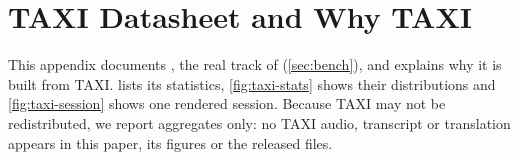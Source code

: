 \section{TAXI Datasheet and Why TAXI}\label{app:taxi}

This appendix documents \taxi, the real track of \bench (\cref{sec:bench}), and explains why it is built from TAXI.  lists its statistics, \cref{fig:taxi-stats} shows their distributions and \cref{fig:taxi-session} shows one rendered session. Because TAXI may not be redistributed, we report aggregates only: no TAXI audio, transcript or translation appears in this paper, its figures or the released files.



